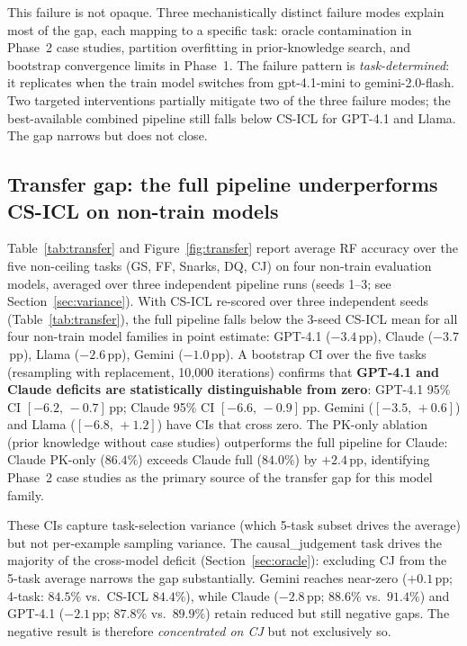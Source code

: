 \documentclass{article}
\begin{document}
This failure is not opaque.
Three mechanistically distinct failure modes explain most of the gap, each mapping to a specific task: oracle contamination in Phase~2 case studies,
partition overfitting in prior-knowledge search, and bootstrap convergence limits in Phase~1.
The failure pattern is \emph{task-determined}: it replicates when the train model switches from
gpt-4.1-mini to gemini-2.0-flash.
Two targeted interventions partially mitigate two of the three failure modes; the best-available
combined pipeline still falls below CS-ICL for GPT-4.1 and Llama.
The gap narrows but does not close.


\subsection{Transfer gap: the full pipeline underperforms CS-ICL on non-train models}
\label{sec:transfer}

Table~\ref{tab:transfer} and Figure~\ref{fig:transfer} report average RF accuracy over the
five non-ceiling tasks (GS, FF, Snarks, DQ, CJ) on four non-train evaluation models,
averaged over three independent pipeline runs (seeds 1--3; see Section~\ref{sec:variance}).
With CS-ICL re-scored over three independent seeds (Table~\ref{tab:transfer}), the full
pipeline falls below the 3-seed CS-ICL mean for all four non-train model families in point estimate:
GPT-4.1 ($-3.4$\,pp), Claude ($-3.7$\,pp), Llama ($-2.6$\,pp), Gemini ($-1.0$\,pp).
A bootstrap CI over the five tasks (resampling with replacement, 10{,}000 iterations) confirms
that \textbf{GPT-4.1 and Claude deficits are statistically distinguishable from zero}:
GPT-4.1 95\% CI $[-6.2,\,-0.7]$\,pp; Claude 95\% CI $[-6.6,\,-0.9]$\,pp.
Gemini ($[-3.5,\,+0.6]$) and Llama ($[-6.8,\,+1.2]$) have CIs that cross zero.
The PK-only ablation (prior knowledge without case studies) outperforms the full
pipeline for Claude: Claude PK-only ($86.4\%$) exceeds Claude full ($84.0\%$) by
$+2.4$\,pp, identifying Phase~2 case studies as the primary source of the transfer gap for
this model family.

These CIs capture task-selection variance (which 5-task subset drives the average) but not
per-example sampling variance.
The causal\_judgement task drives the majority of the cross-model deficit
(Section~\ref{sec:oracle}): excluding CJ from the 5-task average narrows the gap
substantially. Gemini reaches near-zero ($+0.1$\,pp; 4-task: $84.5\%$ vs.\ CS-ICL $84.4\%$),
while Claude ($-2.8$\,pp; $88.6\%$ vs.\ $91.4\%$) and GPT-4.1 ($-2.1$\,pp; $87.8\%$ vs.\ $89.9\%$)
retain reduced but still negative gaps.
The negative result is therefore \emph{concentrated on CJ} but not exclusively so.
\end{document}
